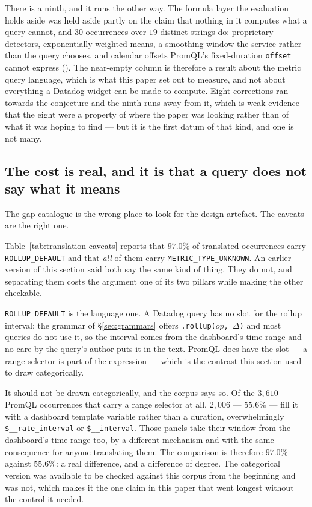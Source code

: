 There is a ninth, and it runs the other way. The formula layer the evaluation holds
aside was held aside partly on the claim that nothing in it computes what a query
cannot, and $30$ occurrences over $19$ distinct strings do: proprietary detectors,
exponentially weighted means, a smoothing window the service rather than the query
chooses, and calendar offsets PromQL's fixed-duration \texttt{offset} cannot express
(). The near-empty column is therefore a result about the metric query
language, which is what this paper set out to measure, and not about everything a
Datadog widget can be made to compute. Eight corrections ran towards the conjecture and
the ninth runs away from it, which is weak evidence that the eight were a property of where
the paper was looking rather than of what it was hoping to find --- but it is the first
datum of that kind, and one is not many.

\subsection{The cost is real, and it is that a query does not say what it means}
\label{sec:cost}

The gap catalogue is the wrong place to look for the design artefact. The caveats are
the right one.

Table~\ref{tab:translation-caveats} reports that $97.0\%$ of translated occurrences carry
\texttt{ROLLUP\_DEFAULT} and that \emph{all} of them carry
\texttt{METRIC\_TYPE\_UNKNOWN}. An earlier version of this section said both say the same
kind of thing. They do not, and separating them costs the argument one of its two
pillars while making the other checkable.

\texttt{ROLLUP\_DEFAULT} is the language one. A Datadog query has no slot for the rollup
interval: the grammar of \S\ref{sec:grammars} offers \texttt{.rollup($\mathit{op}$,
$\Delta$)} and most queries do not use it, so the interval comes from the dashboard's
time range and no care by the query's author puts it in the text. PromQL does have the
slot --- a range selector is part of the expression --- which is the contrast this
section used to draw categorically.

It should not be drawn categorically, and the corpus says so. Of the $3{,}610$ PromQL
occurrences that carry a range selector at all, $2{,}006$ --- $55.6\%$ --- fill it with
a dashboard template variable rather than a duration, overwhelmingly
\texttt{\$\_\_rate\_interval} or \texttt{\$\_\_interval}. Those panels take their window
from the dashboard's time range too, by a different mechanism and with the same
consequence for anyone translating them. The comparison is therefore $97.0\%$ against
$55.6\%$: a real difference, and a difference of degree. The categorical version was
available to be checked against this corpus from the beginning and was not, which makes
it the one claim in this paper that went longest without the control it needed.

